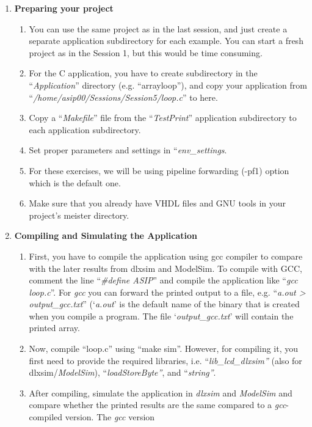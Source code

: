 \begin{enumerate}
\item \textbf{Preparing your project}
	\begin{enumerate}
		\item
		You can use the same project as in the last session, and just create
		a separate application subdirectory for each example. You can start
		a fresh project as in the Session 1, but this would be time
		consuming.
		\item
		For the C application, you have to create subdirectory in the
		``\emph{Application}'' directory (e.g. ``arrayloop''), and copy your
		application from ``\emph{/home/asip00/Sessions/Session5/loop.c}'' to
		here.
		\item
		Copy a ``\emph{Makefile}'' file from the ``\emph{TestPrint}''
		application subdirectory to each application subdirectory.
		\item
		Set proper parameters and settings in ``\emph{env\_settings}.
		\item
		For these exercises, we will be using pipeline forwarding (-pf1)
		option which is the default one.
		\item
		Make sure that you already have VHDL files and GNU tools in your
		project's meister directory.
	\end{enumerate}
\item \textbf{Compiling and Simulating the Application}
	\begin{enumerate}
		\item
		First, you have to compile the application using gcc compiler to
		compare with the later results from dlxsim and ModelSim. To compile
		with GCC, comment the line ``\emph{\#define ASIP}'' and compile the
		application like ``\emph{gcc loop.c}''. For \emph{gcc} you can
		forward the printed output to a file, e.g. ``\emph{a.out
			\textgreater{} output\_gcc.txt}'' (`\emph{a.out}' is the default
		name of the binary that is created when you compile a program. The
		file `\emph{output\_gcc.txt}' will contain the printed array.
		\item
		Now, compile ``loop.c'' using ``make sim''. However, for compiling
		it, you first need to provide the required libraries, i.e.
		``\emph{lib\_lcd\_dlxsim''} (also for dlxsim/\emph{ModelSim}),
		``\emph{loadStoreByte''}, and ``\emph{string''}.
		\item
		After compiling, simulate the application in \emph{dlxsim} and
		\emph{ModelSim} and compare whether the printed results are the same
		compared to a \emph{gcc}-compiled version. The \emph{gcc} version

\end{enumerate}
\end{enumerate}
